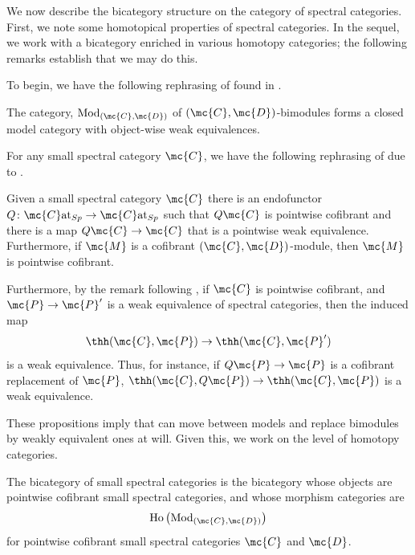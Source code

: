 \documentclass[11pt]{amsart}
\begin{document}
We now describe the bicategory structure on the category of spectral categories. First, we note some homotopical properties of spectral categories. In the sequel, we work with a bicategory enriched in various homotopy categories; the following remarks establish that we may do this.

To begin, we have the following rephrasing of \cite[Prop.~6.1]{schwede_shipley} found in \cite[Prop.~2.4]{blumberg_mandell}.

\begin{prop}
The category, $\operatorname{Mod}_{(\mc{C}, \mc{D})}$ of $(\mc{C}, \mc{D})$-bimodules forms a closed model category with object-wise weak equivalences.
\end{prop}

For any small spectral category $\mc{C}$, we have the following rephrasing of \cite[Prop.~6.3]{schwede_shipley} due to \cite[Prop.~2.7, Prop.~2.8]{blumberg_mandell}.

\begin{prop}
	Given a small spectral category $\mc{C}$ there is an endofunctor $Q\colon  \mc{C}\text{at}_{Sp} \to \mc{C}\text{at}_{Sp}$ such that $Q \mc{C}$ is pointwise cofibrant and there is a map $Q \mc{C} \to \mc{C}$ that is a pointwise weak equivalence. Furthermore, if $\mc{M}$ is a cofibrant $(\mc{C}, \mc{D})$-module, then $\mc{M}$ is pointwise cofibrant. 
\end{prop}

Furthermore, by the remark following \cite[Prop.~3.6]{blumberg_mandell}, if $\mc{C}$ is pointwise cofibrant, and $\mc{P} \to \mc{P}'$ is a weak equivalence of spectral categories,
 then the induced map 
 \[
	\thh(\mc{C}, \mc{P}) \to \thh (\mc{C}, \mc{P}')
 \]
is a weak equivalence.  Thus, for instance, if $Q\mc{P} \to \mc{P}$ is a cofibrant replacement of $\mc{P}$, $\thh(\mc{C}, Q\mc{P}) \to \thh(\mc{C}, \mc{P})$ is a weak equivalence.

These propositions imply that can move  between models and replace bimodules by weakly equivalent ones at will. Given this, we work on the level of homotopy categories.



\begin{defn}
  The bicategory of small spectral categories is the bicategory whose objects are pointwise cofibrant small spectral categories, and whose morphism categories are 
\[
 \operatorname{Ho}\left(\operatorname{Mod}_{(\mc{C}, \mc{D})}\right)
\]
 for pointwise cofibrant small spectral categories $\mc{C}$ and $\mc{D}$.
\end{defn}
\end{document}
